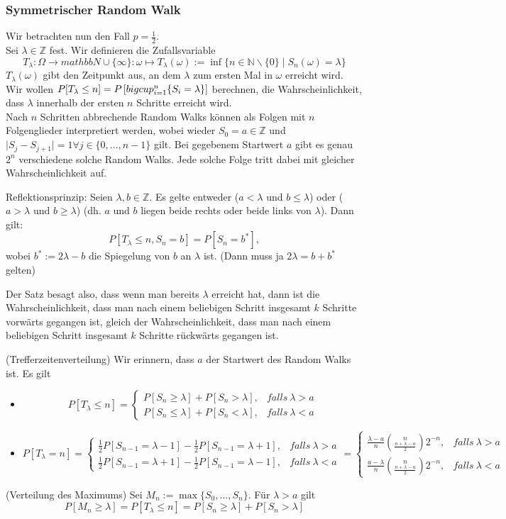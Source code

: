\subsubsection{Symmetrischer Random Walk}
Wir betrachten nun den Fall $p=\frac 12$.\\
Sei $\lambda\in\mathbb Z$ fest. Wir definieren die Zufallsvariable
\[T_\lambda:\Omega\rightarrow mathbb N\cup\{\infty\}:\omega\mapsto T_\lambda(\omega):=\inf\{n\in\mathbb N\backslash\{0\}\mid S_n(\omega)=\lambda\}\]
$T_\lambda(\omega)$ gibt den Zeitpunkt aus, an dem $\lambda$ zum ersten Mal in $\omega$ erreicht wird. Wir wollen $P[T_\lambda\leq n]=P\left[\\bigcup_{i=1}^{n}\{S_i=\lambda\}\right]$ berechnen, die Wahrscheinlichkeit, dass $\lambda$ innerhalb der ersten $n$ Schritte erreicht wird.\\
Nach $n$ Schritten abbrechende Random Walks k\"onnen als Folgen mit $n$ Folgenglieder interpretiert werden, wobei wieder $S_0=a\in\mathbb Z$ und $\lvert S_j-S_{j+1}\rvert=1\forall j\in\{0,...,n-1\}$ gilt. Bei gegebenem Startwert $a$ gibt es genau $2^n$ verschiedene solche Random Walks. Jede solche Folge tritt dabei mit gleicher Wahrscheinlichkeit auf.
\begin{satz}
Reflektionsprinzip: Seien $\lambda, b\in\mathbb Z$. Es gelte entweder ($a<\lambda$ und $b\leq\lambda$) oder ($a>\lambda$ und $b\geq\lambda$) (dh. $a$ und $b$ liegen beide rechts oder beide links von $\lambda$). Dann gilt:
\[P[T_\lambda\leq n,S_n=b]=P[S_n=b^\ast],\]
wobei $b^\ast:=2\lambda-b$ die Spiegelung von $b$ an $\lambda$ ist. (Dann muss ja $2\lambda=b+b^\ast$ gelten)
\end{satz}
Der Satz besagt also, dass wenn man bereits $\lambda$ erreicht hat, dann ist die Wahrscheinlichkeit, dass man nach einem beliebigen Schritt insgesamt $k$ Schritte vorw\"arts gegangen ist, gleich der Wahrscheinlichkeit, dass man nach einem beliebigen Schritt insgesamt $k$ Schritte r\"uckw\"arts gegangen ist.
\begin{satz}
(Trefferzeitenverteilung) Wir erinnern, dass $a$ der Startwert des Random Walks ist. Es gilt
\begin{itemize}
\item \[P[T_\lambda\leq n]=\left\{\begin{array}{ll} P[S_n\geq\lambda]+P[S_n>\lambda],&falls\ \lambda>a\\ P[S_n\leq\lambda]+P[S_n<\lambda],&falls\ \lambda<a\end{array}\right.\]
\item \[P[T_\lambda=n]=\left\{\begin{array}{ll}
\frac 12P[S_{n-1}=\lambda-1]-\frac 12P[S_{n-1}=\lambda+1],&falls\ \lambda>a\\
\frac 12P[S_{n-1}=\lambda+1]-\frac 12P[S_{n-1}=\lambda-1],&falls\ \lambda<a\end{array}\right.=\left\{\begin{array}{ll}
\frac{\lambda-a}n\binom n{\frac{n+\lambda-a}2}2^{-n},&falls\ \lambda>a\\
\frac{a-\lambda}n\binom n{\frac{n+\lambda-a}2}2^{-n},&falls\ \lambda<a\end{array}\right.\]
\end{itemize}
\end{satz}
\begin{korollar}
(Verteilung des Maximums) Sei $M_n:=\max\{S_0,...,S_n\}$. F\"ur $\lambda>a$ gilt
\[P[M_n\geq\lambda ]=P[T_\lambda\leq n]=P[S_n\geq\lambda]+P[S_n>\lambda]\]
\end{korollar}
